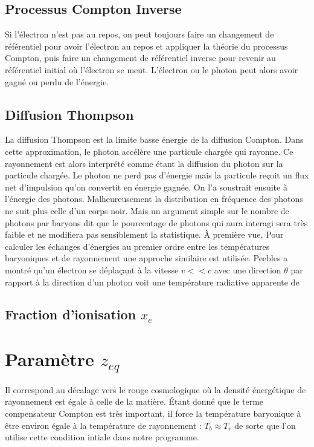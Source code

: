\documentclass[10pt, a4paper]{report}
\numberwithin{equation}{subsection}
\begin{document}
\subsection{Processus Compton Inverse}
Si l'électron n'est pas au repos, on peut toujours faire un changement de référentiel pour avoir l'électron au repos et appliquer la théorie du processus Compton, puis faire un changement de référentiel inverse pour revenir au référentiel initial où l'électron se meut. L'électron ou le photon peut alors avoir gagné ou perdu de l'énergie.
\subsection{Diffusion Thompson}
La diffusion Thompson est la limite basse énergie de la diffusion Compton. Dans cette approximation, le photon accélère une particule chargée qui rayonne. Ce rayonnement est alors interprété comme étant la diffusion du photon sur la particule chargée. Le photon ne perd pas d'énergie mais la particule reçoit un flux net d'impulsion qu'on convertit en énergie gagnée. On l'a soustrait ensuite à l'énergie des photons. Malheureusement la distribution en fréquence des photons ne suit plus celle d'un corps noir. Mais un argument simple sur le nombre de photons par baryons dit que le pourcentage de photons qui aura interagi sera très faible et ne modifiera pas sensiblement la statistique. À première vue, 
Pour calculer les échanges d'énergies au premier ordre entre les températures baryoniques et de rayonnement une approche similaire est utilisée. Peebles a montré qu'un électron se déplaçant à la vitesse $v<<c$ avec une direction $\theta $ par rapport à la direction d'un photon voit une température radiative apparente de 

  

 
\subsection{Fraction d'ionisation $x_e$}
\section{Paramètre $z_{eq}$}
Il correspond au décalage vers le rouge cosmologique où la densité énergétique de rayonnement est égale à celle de la matière. \uppercase{é}tant donné que le terme compensateur Compton est très important, il force la température baryonique à être environ égale à la température de rayonnement : $T_b \approx T_r$ de sorte que l'on utilise cette condition intiale dans notre programme.
\end{document}

